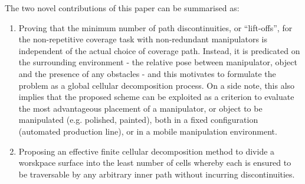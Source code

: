 \documentclass[journal]{IEEEtran}
\begin{document}
%

%
The two novel contributions of this paper can be summarised as: 
\begin{enumerate}
\item Proving that the minimum number of path discontinuities, or ``lift-offs'', for the non-repetitive coverage task with non-redundant manipulators is independent of the actual choice of coverage path. 
Instead, it is predicated on the surrounding environment - the relative pose between manipulator, object and the presence of any obstacles - and this motivates to formulate the problem as a global cellular decomposition process.
On a side note, this also implies that the proposed scheme can be exploited as a criterion to evaluate the most advantageous placement of a manipulator, or object to be manipulated (e.g. polished, painted), both in a fixed configuration (automated production line), or in a mobile manipulation environment. 
\item Proposing an effective finite cellular decomposition method to divide a worskpace surface into the least number of cells whereby each is ensured to be traversable by any arbitrary inner path without incurring discontinuities.
\end{enumerate}
\end{document}
